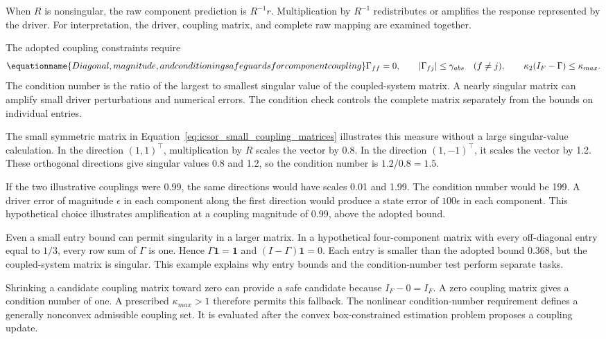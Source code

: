 When \(R\) is nonsingular, the raw component prediction is \(R^{-1}r\). Multiplication by \(R^{-1}\) redistributes or amplifies the response represented by the driver. For interpretation, the driver, coupling matrix, and complete raw mapping are examined together.

The adopted coupling constraints require
\begin{equation}
\equationname{Diagonal, magnitude, and conditioning safeguards for component coupling}
\label{eq:icsor_coupling_safeguards}
\Gamma_{ff}=0,
\qquad |\Gamma_{fj}|\leq\gamma_{abs}\quad(f\neq j),
\qquad \kappa_2(I_F-\Gamma)\leq\kappa_{max}.
\end{equation}
The condition number is the ratio of the largest to smallest singular value of the coupled-system matrix. A nearly singular matrix can amplify small driver perturbations and numerical errors. The condition check controls the complete matrix separately from the bounds on individual entries.

The small symmetric matrix in Equation~\eqref{eq:icsor_small_coupling_matrices} illustrates this measure without a large singular-value calculation. In the direction \((1,1)^\top\), multiplication by \(R\) scales the vector by 0.8. In the direction \((1,-1)^\top\), it scales the vector by 1.2. These orthogonal directions give singular values 0.8 and 1.2, so the condition number is \(1.2/0.8=1.5\).

If the two illustrative couplings were 0.99, the same directions would have scales 0.01 and 1.99. The condition number would be 199. A driver error of magnitude \(\epsilon\) in each component along the first direction would produce a state error of \(100\epsilon\) in each component. This hypothetical choice illustrates amplification at a coupling magnitude of 0.99, above the adopted bound.

Even a small entry bound can permit singularity in a larger matrix. In a hypothetical four-component matrix with every off-diagonal entry equal to \(1/3\), every row sum of \(\Gamma\) is one. Hence \(\Gamma\mathbf{1}=\mathbf{1}\) and \((I-\Gamma)\mathbf{1}=0\). Each entry is smaller than the adopted bound 0.368, but the coupled-system matrix is singular. This example explains why entry bounds and the condition-number test perform separate tasks.

Shrinking a candidate coupling matrix toward zero can provide a safe candidate because \(I_F-0=I_F\). A zero coupling matrix gives a condition number of one. A prescribed \(\kappa_{max}>1\) therefore permits this fallback. The nonlinear condition-number requirement defines a generally nonconvex admissible coupling set. It is evaluated after the convex box-constrained estimation problem proposes a coupling update.

